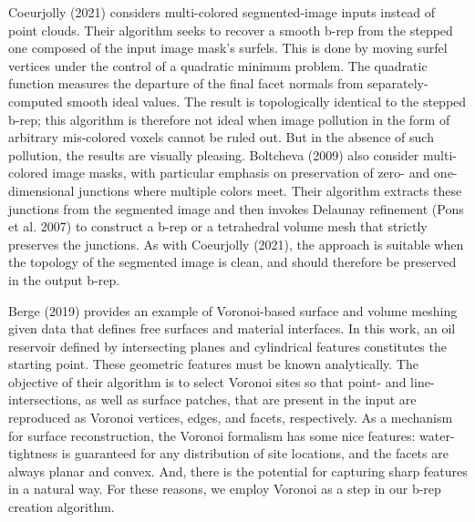 Coeurjolly (2021) considers multi-colored segmented-image inputs instead of point clouds.  Their algorithm seeks to recover a smooth b-rep from the stepped one composed of the input image mask's surfels.  This is done by moving surfel vertices under the control of a quadratic minimum problem.  The quadratic function measures the departure of the final facet normals from separately-computed smooth ideal values.  The result is topologically identical to the stepped b-rep; this algorithm is therefore not ideal when image pollution in the form of arbitrary mis-colored voxels cannot be ruled out.  But in the absence of such pollution, the results are visually pleasing.  Boltcheva (2009) also consider multi-colored image masks, with particular emphasis on preservation of zero- and one-dimensional junctions where multiple colors meet.  Their algorithm extracts these junctions from the segmented image and then invokes Delaunay refinement (Pons et al. 2007) to construct a b-rep or a tetrahedral volume mesh that strictly preserves the junctions.  As with Coeurjolly (2021), the approach is suitable when the topology of the segmented image is clean, and should therefore be preserved in the output b-rep.  

Berge (2019) provides an example of Voronoi-based surface and volume meshing given data that defines free surfaces and material interfaces.  In this work, an oil reservoir defined by intersecting planes and cylindrical features constitutes the starting point.  These geometric features must be known analytically.  The objective of their algorithm is to select Voronoi sites so that point- and line-intersections, as well as surface patches, that are present in the input are reproduced as Voronoi vertices, edges, and facets, respectively.  As a mechanism for surface reconstruction, the Voronoi formalism has some nice features:  water-tightness is guaranteed for any distribution of site locations, and the facets are always planar and convex.  And, there is the potential for capturing sharp features in a natural way.  For these reasons, we employ Voronoi as a step in our b-rep creation algorithm.

